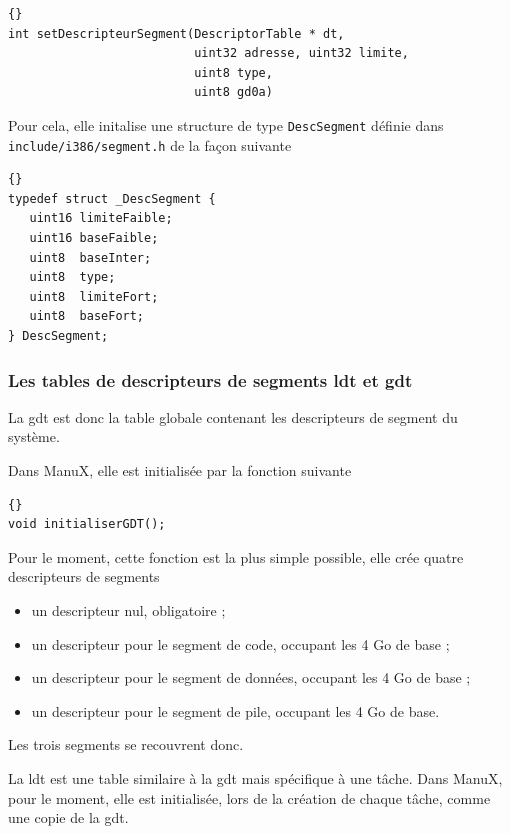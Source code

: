 \begin{lstlisting}{}
int setDescripteurSegment(DescriptorTable * dt,
                          uint32 adresse, uint32 limite,
                          uint8 type,
                          uint8 gd0a)
\end{lstlisting}  

   Pour cela, elle initalise une structure de type
\lstinline!DescSegment! définie dans
\lstinline!include/i386/segment.h! de la façon suivante

\begin{lstlisting}{}
typedef struct _DescSegment {
   uint16 limiteFaible;
   uint16 baseFaible;
   uint8  baseInter;
   uint8  type;
   uint8  limiteFort;
   uint8  baseFort;
} DescSegment;
\end{lstlisting}  

\subsubsection{Les tables de descripteurs de segments {\sc ldt} et {\sc gdt}}

   La {\sc gdt} est donc la table globale contenant les descripteurs
de segment du système.

   Dans ManuX, elle est initialisée par la fonction suivante

\begin{lstlisting}{}
void initialiserGDT();     
\end{lstlisting}

   Pour le moment, cette fonction est la plus simple possible, elle
crée quatre descripteurs de segments

\begin{itemize}
   \item un descripteur nul, obligatoire ;
   \item un descripteur pour le segment de code, occupant les 4 Go de base ;
   \item un descripteur pour le segment de données, occupant les 4 Go de base ;
   \item un descripteur pour le segment de pile, occupant les 4 Go de base.
\end{itemize}

   Les trois segments se recouvrent donc.

   La {\sc ldt} est une table similaire à la {\sc gdt} mais spécifique
à une tâche. Dans ManuX, pour le moment, elle est initialisée, lors de
la création de chaque tâche, comme une copie de la {\sc gdt}.


